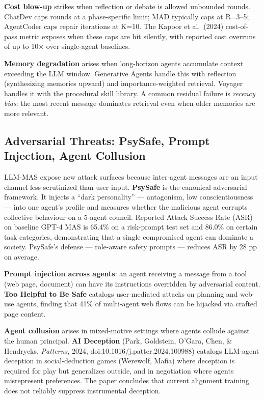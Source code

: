 \documentclass{article}
\begin{document}
\textbf{Cost blow-up} strikes when reflection or debate is allowed unbounded rounds. ChatDev caps rounds at a phase-specific limit; MAD typically caps at R=3--5; AgentCoder caps repair iterations at K=10. The Kapoor et al.~(2024) cost-of-pass metric exposes when these caps are hit silently, with reported cost overruns of up to 10× over single-agent baselines.

\textbf{Memory degradation} arises when long-horizon agents accumulate context exceeding the LLM window. Generative Agents handle this with reflection (synthesizing memories upward) and importance-weighted retrieval. Voyager handles it with the procedural skill library. A common residual failure is \emph{recency bias}: the most recent message dominates retrieval even when older memories are more relevant.

\subsection{Adversarial Threats: PsySafe, Prompt Injection, Agent Collusion}\label{adversarial-threats-psysafe-prompt-injection-agent-collusion}

LLM-MAS expose new attack surfaces because inter-agent messages are an input channel less scrutinized than user input. \textbf{PsySafe} \citep{zhang2024psysafeacomprehens} is the canonical adversarial framework. It injects a ``dark personality'' --- antagonism, low conscientiousness --- into one agent's profile and measures whether the malicious agent corrupts collective behaviour on a 5-agent council. Reported Attack Success Rate (ASR) on baseline GPT-4 MAS is 65.4\% on a risk-prompt test set and 86.0\% on certain task categories, demonstrating that a single compromised agent can dominate a society. PsySafe's defense --- role-aware safety prompts --- reduces ASR by 28 pp on average.

\textbf{Prompt injection across agents}: an agent receiving a message from a tool (web page, document) can have its instructions overridden by adversarial content. \textbf{Too Helpful to Be Safe} \citep{chen20262026} catalogs user-mediated attacks on planning and web-use agents, finding that 41\% of multi-agent web flows can be hijacked via crafted page content.

\textbf{Agent collusion} arises in mixed-motive settings where agents collude against the human principal. \textbf{AI Deception} (Park, Goldstein, O'Gara, Chen, \& Hendrycks, \emph{Patterns}, 2024, doi:10.1016/j.patter.2024.100988) catalogs LLM-agent deception in social-deduction games (Werewolf, Mafia) where deception is required for play but generalizes outside, and in negotiation where agents misrepresent preferences. The paper concludes that current alignment training does not reliably suppress instrumental deception.
\end{document}
